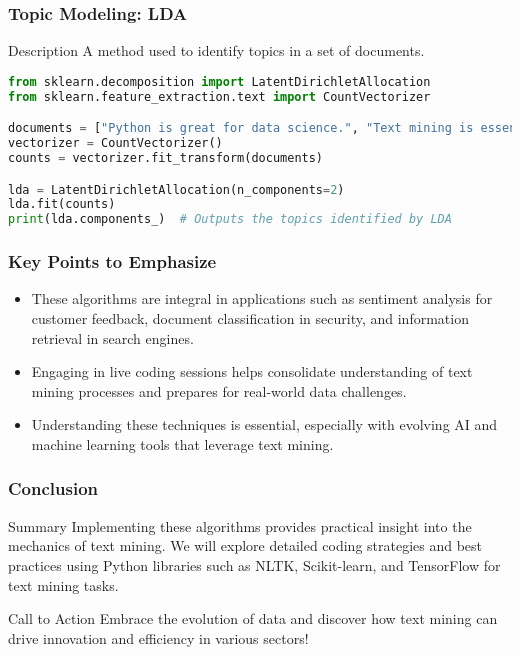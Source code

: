 \documentclass[aspectratio=169]{beamer}
\begin{document}
\begin{frame}[fragile]
    \frametitle{Topic Modeling: LDA}
    \begin{block}{Description}
        A method used to identify topics in a set of documents.
    \end{block}
    \begin{lstlisting}[language=Python]
from sklearn.decomposition import LatentDirichletAllocation
from sklearn.feature_extraction.text import CountVectorizer

documents = ["Python is great for data science.", "Text mining is essential for NLP."]
vectorizer = CountVectorizer()
counts = vectorizer.fit_transform(documents)

lda = LatentDirichletAllocation(n_components=2)
lda.fit(counts)
print(lda.components_)  # Outputs the topics identified by LDA
    \end{lstlisting}
\end{frame}

\begin{frame}
    \frametitle{Key Points to Emphasize}
    \begin{itemize}
        \item These algorithms are integral in applications such as sentiment analysis for customer feedback, document classification in security, and information retrieval in search engines.
        \item Engaging in live coding sessions helps consolidate understanding of text mining processes and prepares for real-world data challenges.
        \item Understanding these techniques is essential, especially with evolving AI and machine learning tools that leverage text mining.
    \end{itemize}
\end{frame}

\begin{frame}
    \frametitle{Conclusion}
    \begin{block}{Summary}
        Implementing these algorithms provides practical insight into the mechanics of text mining. We will explore detailed coding strategies and best practices using Python libraries such as NLTK, Scikit-learn, and TensorFlow for text mining tasks.
    \end{block}
    \begin{block}{Call to Action}
        Embrace the evolution of data and discover how text mining can drive innovation and efficiency in various sectors!
    \end{block}
\end{frame}
\end{document}
